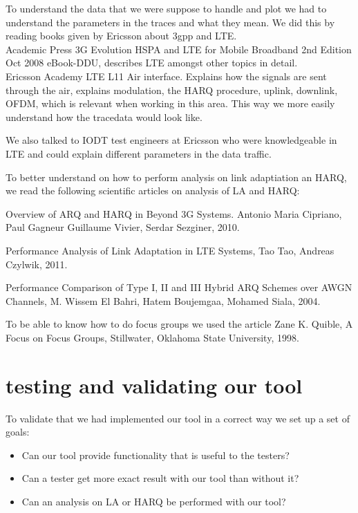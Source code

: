 \documentclass[cropmarks, frame, english]{idamasterthesis}
\begin{document}
To understand the data that we were suppose to handle and plot we had to understand the parameters in the traces and what they mean. We did this by reading books given by Ericsson about 3gpp and LTE. \\

Academic Press 3G Evolution HSPA and LTE for Mobile Broadband 2nd Edition Oct 2008 eBook-DDU, describes LTE amongst other topics in detail. \\

Ericsson Academy LTE L11 Air interface. Explains how the signals are sent through the air,  explains modulation, the HARQ procedure, uplink, downlink, OFDM, which is relevant when working in this area. This way we more easily understand how the tracedata would look like.

We also talked to IODT test engineers at Ericsson who were knowledgeable in LTE and could explain different parameters in the data traffic.

To better understand on how to perform analysis on link adaptiation an HARQ, we read the following scientific articles on analysis of LA and HARQ:

Overview of ARQ and HARQ in Beyond 3G Systems. Antonio Maria Cipriano, Paul Gagneur Guillaume Vivier, Serdar Sezginer, 2010.

Performance Analysis of Link Adaptation in LTE Systems, Tao Tao, Andreas Czylwik, 2011.

Performance Comparison of Type I, II and III Hybrid ARQ Schemes over AWGN Channels, M. Wissem El Bahri, Hatem Boujemgaa, Mohamed Siala, 2004.

To be able to know how to do focus groups we used the article 
Zane K. Quible, A Focus on Focus Groups, Stillwater, Oklahoma State University, 1998.


\section{testing and validating our tool}

To validate that we had implemented our tool in a correct way we set up a set of goals:
\begin{itemize}
\item Can our tool provide functionality that is useful to the testers?
\item Can a tester get more exact result with our tool than without it?
\item Can an analysis on LA or HARQ be performed with our tool?
\end{itemize}
\end{document}
